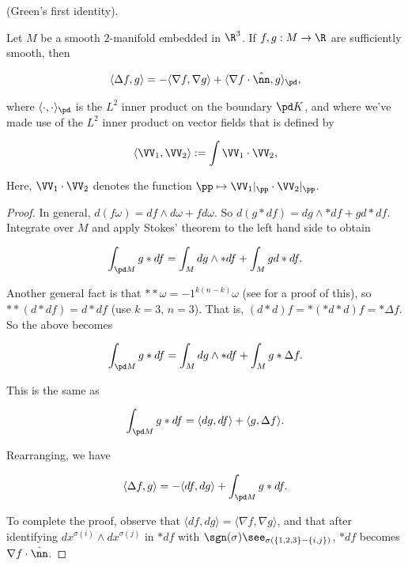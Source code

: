 \begin{lemma}
\label{ch::ddg::lemma:green_first_identity}
    (Green's first identity).
    
    Let $M$ be a smooth $2$-manifold embedded in $\R^3$. If $f, g:M \rightarrow \R$ are sufficiently smooth, then
    
    \begin{align*}
        \langle \Delta f, g \rangle = -\langle \nabla f, \nabla g \rangle + \langle \nabla f \cdot \hat{\nn}, g \rangle_\pd,
    \end{align*}
    
    where $\langle \cdot, \cdot \rangle_\pd$ is the $L^2$ inner product on the boundary $\pd K$, and where we've made use of the $L^2$ inner product on vector fields that is defined by
    
    \begin{align*}
        \langle \VV_1, \VV_2 \rangle := \int \VV_1 \cdot \VV_2,
    \end{align*}
    
    Here, $\VV_1 \cdot \VV_2$ denotes the function $\pp \mapsto \VV_1|_\pp \cdot \VV_2|_\pp$.
\end{lemma}

\begin{proof}
    In general, $d(f\omega) = df \wedge d\omega + fd\omega$. So $d(g * df) = dg \wedge *df + gd*df$. Integrate over $M$ and apply Stokes' theorem to the left hand side to obtain
    
    \begin{align*}
        \int_{\pd M} g * df = \int_M dg \wedge *df + \int_M g d*df.
    \end{align*}
    
    Another general fact is that $**\omega = -1^{k(n-k)} \omega$ (see \cite{HodgeStar} for a proof of this), so $**(d*df) = d*df$ (use $k = 3$, $n = 3$). That is, $(d*d)f = *(*d*d)f = * \Delta f$. So the above becomes
    
    \begin{align*}
        \int_{\pd M} g * df =  \int_M dg \wedge *df + \int_M g *\Delta f.
    \end{align*}
    
    This is the same as
    
    \begin{align*}
        \int_{\pd M} g*df = \langle dg, df \rangle + \langle g, \Delta f \rangle.
    \end{align*}
    
    Rearranging, we have
    
    \begin{align*}
        \langle \Delta f, g \rangle = - \langle df, dg \rangle + \int_{\pd M} g*df.
    \end{align*}
    
    To complete the proof, observe that $\langle df, dg \rangle = \langle \nabla f, \nabla g \rangle$, and that after identifying $dx^{\sigma(i)} \wedge dx^{\sigma(j)}$ in $*df$ with $\sgn(\sigma) \see_{\sigma(\{1, 2, 3\} - \{i, j\})}$, $*df$ becomes $\nabla f \cdot \hat{\nn}$.
\end{proof}

